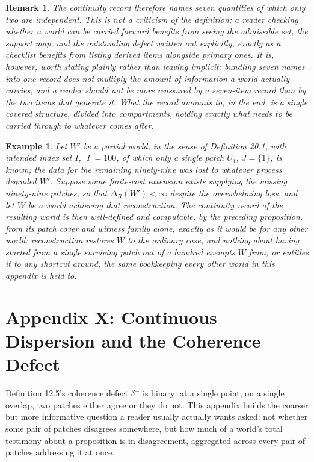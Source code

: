 \documentclass[11pt]{book}
\newtheorem*{appendixremark}{Remark}
\newtheorem*{appendixexample}{Example}
\begin{document}
\begin{appendixremark}
The continuity record therefore names seven quantities of which only two are independent. This is not a criticism of the definition; a reader checking whether a world can be carried forward benefits from seeing the admissible set, the support map, and the outstanding defect written out explicitly, exactly as a checklist benefits from listing derived items alongside primary ones. It is, however, worth stating plainly rather than leaving implicit: bundling seven names into one record does not multiply the amount of information a world actually carries, and a reader should not be more reassured by a seven-item record than by the two items that generate it. What the record amounts to, in the end, is a single covered structure, divided into compartments, holding exactly what needs to be carried through to whatever comes after.
\end{appendixremark}

\begin{appendixexample}
Let $W'$ be a partial world, in the sense of Definition 20.1, with intended index set $I$, $|I| = 100$, of which only a single patch $U_1$, $J = \{1\}$, is known; the data for the remaining ninety-nine was lost to whatever process degraded $W'$. Suppose some finite-cost extension exists supplying the missing ninety-nine patches, so that $\Delta_R(W') < \infty$ despite the overwhelming loss, and let $W$ be a world achieving that reconstruction. The continuity record of the resulting world is then well-defined and computable, by the preceding proposition, from its patch cover and witness family alone, exactly as it would be for any other world: reconstruction restores $W$ to the ordinary case, and nothing about having started from a single surviving patch out of a hundred exempts $W$ from, or entitles it to any shortcut around, the same bookkeeping every other world in this appendix is held to.
\end{appendixexample}



\chapter*{Appendix X: Continuous Dispersion and the Coherence Defect}

Definition 12.5's coherence defect $\delta^\pm$ is binary: at a single point, on a single overlap, two patches either agree or they do not. This appendix builds the coarser but more informative question a reader usually actually wants asked: not whether some pair of patches disagrees somewhere, but how much of a world's total testimony about a proposition is in disagreement, aggregated across every pair of patches addressing it at once.
\end{document}
